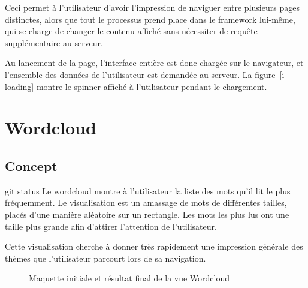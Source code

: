 		Ceci permet à l'utilisateur d'avoir l'impression de naviguer entre plusieurs pages distinctes, alors que tout le processus prend place dans le framework lui-même, qui se charge de changer le contenu affiché sans nécessiter de requête supplémentaire au serveur.

		Au lancement de la page, l'interface entière est donc chargée sur le navigateur, et l'ensemble des données de l'utilisateur est demandée au serveur. La figure~\ref{i-loading} montre le spinner affiché à l'utilisateur pendant le chargement.

%
%
%
%

\section{Wordcloud}

	\subsection{Concept}
git status
		Le wordcloud montre à l'utilisateur la liste des mots qu'il lit le plus fréquemment. Le visualisation est un amassage de mots de différentes tailles, placés d'une manière aléatoire sur un rectangle. Les mots les plus lus ont une taille plus grande afin d'attirer l'attention de l'utilisateur.

		Cette visualisation cherche à donner très rapidement une impression générale des thèmes que l'utilisateur parcourt lors de sa navigation.

		\begin{figure}[!h]
			\centering
			\caption{Maquette initiale et résultat final de la vue Wordcloud}
			\label{wordcloud_images}
		\end{figure}

